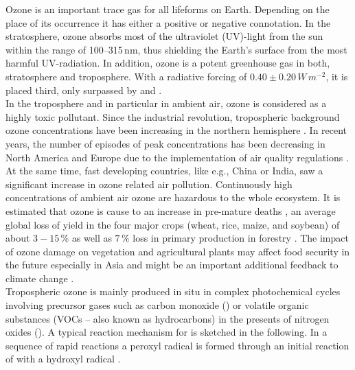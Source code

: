 \documentclass[gmd, manuscript]{copernicus}
\begin{document}
\introduction  %
Ozone is an important trace gas for all lifeforms on Earth. Depending on the place of its occurrence it has either a positive or negative connotation. In the stratosphere, ozone absorbs most of the ultraviolet (UV)-light from the sun within the range of 100--315\,\unit{nm}, thus shielding the Earth's surface from the most harmful UV-radiation. In addition, ozone is a potent greenhouse gas in both, stratosphere and troposphere. With a radiative forcing of $0.40 \pm 0.20\,\unit{W\,m^{-2}}$, it is placed third, only surpassed by  and  \citep[Chapter 8]{IPCC2013}.\\
In the troposphere and in particular in ambient air, ozone is considered as a highly toxic pollutant. Since the industrial revolution, tropospheric background ozone concentrations have been increasing in the northern hemisphere \citep[Chapter 2]{IPCC2013}. In recent years, the number of episodes of peak concentrations has been decreasing in North America and Europe due to the implementation of air quality regulations \citep[e.g.,][]{ACP:Wilson2012}. At the same time, fast developing countries, like e.g., China or India, saw a significant increase in ozone related air pollution. Continuously high concentrations of ambient air ozone are hazardous to the whole ecosystem. It is estimated that ozone is cause to an increase in pre-mature deaths \citep{WHO2008}, an average global loss of yield in the four major crops (wheat, rice, maize, and soybean) of about $3-15\,\unit{\%}$ \citep{PJ:Ainsworth2017} as well as $7\,\unit{\%}$ loss in primary production in forestry \citep{GCB:Wittig2009,EP:Matyssek2012}. The impact of ozone damage on vegetation and agricultural plants may affect food security in the future especially in Asia \citep{GCB:Tang2013,NCC:Tai2014,AE:Chuwah2015} and might be an important additional feedback to climate change \citep{Nat:Sitch2007}.\\
Tropospheric ozone is mainly produced in situ in complex photochemical cycles involving precursor gases such as carbon monoxide () or volatile organic substances (VOCs -- also known as hydrocarbons) in the presents of nitrogen oxides (). A typical reaction mechanism for  is sketched in the following. In a sequence of rapid reactions a peroxyl radical  is formed through an initial reaction of  with a hydroxyl radical .
\end{document}
